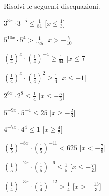 \begin{esercizio}\label{ese:}
 Risolvi le seguenti disequazioni.
\begin{multicols}{2}
 \begin{enumeratea}
  \item  \(3^{3x} \cdot 3^{-5} \leqslant \frac{1}{81}\)
   \hfill [\(x \leqslant \frac{1}{3}\)]
  \item  \(5^{10x} \cdot 5^{4} > \frac{1}{125}\)
   \hfill [\(x > -\frac{7}{10}\)]
  \item  \(\left(\frac{1}{4}\right)^{x} \cdot \left(\frac{1}{4}\right)^{-4} 
\geqslant \frac{1}{64}\)
   \hfill [\(x \leqslant 7\)]
  \item  \(\left(\frac{1}{4}\right)^{x} \cdot \left(\frac{1}{4}\right)^{2} 
\geqslant \frac{1}{4}\)
   \hfill [\(x \leqslant -1\)]
  \item  \(2^{6x} \cdot 2^{8} \leqslant \frac{1}{4}\)
   \hfill [\(x \leqslant -\frac{5}{3}\)]
  \item  \(5^{-9x} \cdot 5^{-4} \leqslant 25\)
   \hfill [\(x \geqslant -\frac{2}{3}\)]
  \item  \(4^{-7x} \cdot 4^{4} \leqslant 1\)
   \hfill [\(x \geqslant \frac{4}{7}\)]
  \item  \(\left(\frac{1}{5}\right)^{-8x} \cdot \left(\frac{1}{5}\right)^{-11} 
< 625\)
   \hfill [\(x < -\frac{7}{8}\)]
  \item  \(\left(\frac{1}{5}\right)^{-2x} \cdot \left(\frac{1}{5}\right)^{-6} 
\leqslant \frac{1}{5}\)
   \hfill [\(x \leqslant -\frac{7}{2}\)]
  \item  \(\left(\frac{1}{4}\right)^{-3x} \cdot \left(\frac{1}{4}\right)^{-12} 
> \frac{1}{4}\)
   \hfill [\(x > -\frac{13}{3}\)]
 \end{enumeratea}
\end{multicols}
\end{esercizio}


